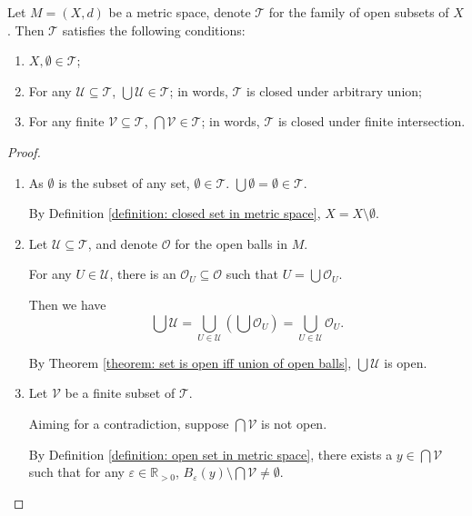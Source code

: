 \begin{theorem}
	Let $M = (X, d)$ be a metric space, denote $\mathcal T$ for the family of open subsets of $X$. Then $\mathcal T$ satisfies the following conditions:
	
	\begin{enumerate}[\bf O1.]
		\item $X, \emptyset \in \mathcal T$;
		\item For any $\mathcal U \subseteq \mathcal T$, $\bigcup \mathcal U \in \mathcal T$; in words, $\mathcal T$ is closed under arbitrary union;
		\item For any finite $\mathcal V \subseteq \mathcal T$, $\bigcap \mathcal V \in \mathcal T$; in words, $\mathcal T$ is closed under finite intersection.
	\end{enumerate}
	
	\begin{proof} \
		\begin{enumerate}[\bf O1.]
			\item
				As $\emptyset$ is the subset of any set, $\emptyset \in \mathcal T$. $\bigcup \emptyset = \emptyset \in \mathcal T$.
			
				By Definition \ref{definition: closed set in metric space}, $X = X \setminus \emptyset$.
				
				\qedlemma
				
			\item 
				Let $\mathcal U \subseteq \mathcal T$, and denote $\mathcal O$ for the open balls in $M$.
			
				For any $U \in \mathcal U$, there is an $\mathcal O_U \subseteq \mathcal O$ such that $U = \bigcup \mathcal O_U$. 
				
				Then we have
				$$
				\bigcup \mathcal U = \bigcup_{U \in \mathcal U} \left( \bigcup \mathcal O_U \right) = \bigcup_{U \in \mathcal U} \mathcal O_U.
				$$
				
				By Theorem \ref{theorem: set is open iff union of open balls}, $\bigcup \mathcal U$ is open.
				
				\qedlemma
				
			\item
				Let $\mathcal V$ be a finite subset of $\mathcal T$.
				
				Aiming for a contradiction, suppose $\bigcap \mathcal V$ is not open.
				
				By Definition \ref{definition: open set in metric space}, there exists a $y \in \bigcap \mathcal V$ such that for any $\varepsilon \in \mathbb R_{> 0}$, $B_\varepsilon(y) \setminus \bigcap \mathcal V \ne \emptyset$.
				

\end{enumerate}
\end{proof}
\end{theorem}
